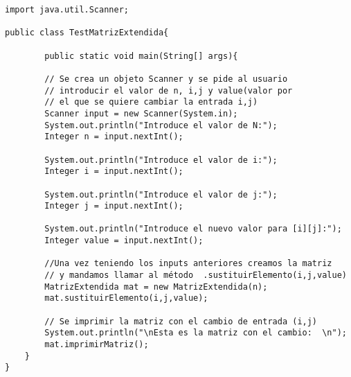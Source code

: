 \documentclass[11pt, oneside]{article}
\begin{document}
\begin{verbatim}
import java.util.Scanner; 

public class TestMatrizExtendida{

        public static void main(String[] args){

        // Se crea un objeto Scanner y se pide al usuario
        // introducir el valor de n, i,j y value(valor por
        // el que se quiere cambiar la entrada i,j)
        Scanner input = new Scanner(System.in);
        System.out.println("Introduce el valor de N:");
        Integer n = input.nextInt();

        System.out.println("Introduce el valor de i:");
        Integer i = input.nextInt();

        System.out.println("Introduce el valor de j:");
        Integer j = input.nextInt();

        System.out.println("Introduce el nuevo valor para [i][j]:");
        Integer value = input.nextInt();
        
        //Una vez teniendo los inputs anteriores creamos la matriz
        // y mandamos llamar al método  .sustituirElemento(i,j,value)
        MatrizExtendida mat = new MatrizExtendida(n);
        mat.sustituirElemento(i,j,value);

        // Se imprimir la matriz con el cambio de entrada (i,j)
        System.out.println("\nEsta es la matriz con el cambio:  \n");
        mat.imprimirMatriz();
    }
}
\end{verbatim}
\end{document}
